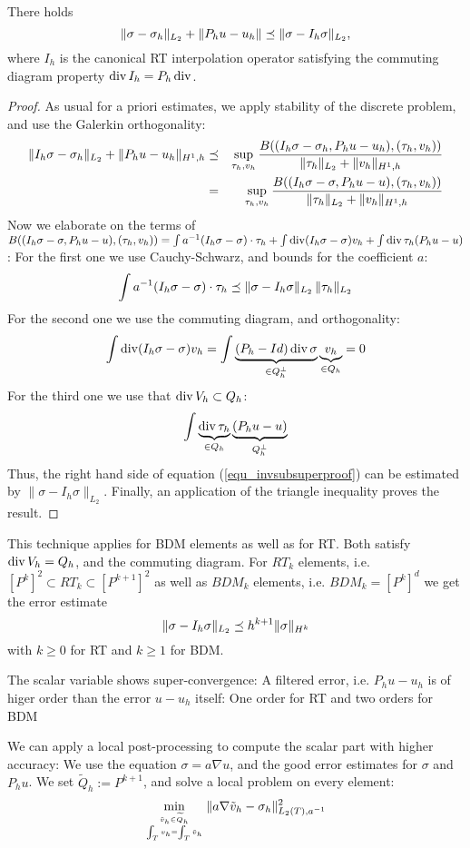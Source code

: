 \begin{theorem} There holds
$$
\| \sigma - \sigma_h \|_{L_2} + \| P_h u - u_h \|  \preceq \| \sigma - I_h \sigma \|_{L_2},
$$
where $I_h$ is the canonical RT interpolation operator satisfying the commuting diagram property $\operatorname{div} I_h = P_h \operatorname{div}$.
\end{theorem}
\begin{proof} As usual for a priori estimates, we apply stability of the discrete problem, and use the Galerkin orthogonality:
\begin{eqnarray}
\| I_h \sigma - \sigma_h \|_{L_2} + \| P_h u - u_h \|_{H^1,h} & \preceq & \sup_{\tau_h, v_h} \frac{B( (I_h \sigma - \sigma_h, P_h u - u_h), (\tau_h, v_h) )}  { \| \tau_h \|_{L_2} + \| v_h \|_{H^1,h}} \\
& = & 
\label{equ_invsubsuperproof}
\sup_{\tau_h, v_h} \frac{B( (I_h \sigma - \sigma, P_h u - u), (\tau_h, v_h) )}  { \| \tau_h \|_{L_2} + \| v_h \|_{H^1,h}} 
\end{eqnarray}
Now we elaborate on the terms of  $B( (I_h \sigma - \sigma, P_h u - u), (\tau_h, v_h) ) = \int a^{-1} (I_h \sigma - \sigma) \cdot \tau_h +
\int \operatorname{div} (I_h \sigma - \sigma) v_h + \int \operatorname{div} \tau_h (P_h u - u)$:
For the first one we use Cauchy-Schwarz, and bounds for the coefficient $a$:
$$
\int a^{-1} (I_h \sigma - \sigma) \cdot \tau_h \preceq \| \sigma - I_h \sigma \|_{L_2} \, \| \tau_h \|_{L_2}
$$
For the second one we use the commuting diagram, and orthogonality:
$$
\int \operatorname{div} (I_h \sigma - \sigma) v_h = \int \underbrace{ (P_h - Id) \operatorname{div} \sigma }_{\in Q_h^\bot} \underbrace{ v_h }_{\in Q_h} = 0
$$
For the third one we use that $\operatorname{div} V_h \subset Q_h$:
$$
\int \underbrace{ \operatorname{div} \tau_h}_{\in Q_h}   \underbrace{ (P_h  u - u) }_{Q_h^\bot}
$$
Thus, the right hand side of equation (\ref{equ_invsubsuperproof}) can be estimated by $\| \sigma - I_h \sigma \|_{L_2}$. Finally, an application of the
 triangle inequality proves the result.
\end{proof}

\begin{remark} This technique applies for BDM elements as well as for RT. Both satisfy $\operatorname{div} V_h = Q_h$, and the commuting diagram.
For $RT_k$ elements, i.e. $[P^{k}]^2 \subset RT_k \subset [P^{k+1}]^2$ as well as $BDM_k$ elements, i.e. $BDM_k = [P^k]^d$
we get the error estimate
$$
\| \sigma - I_h \sigma \|_{L_2} \preceq h^{k+1} \| \sigma \|_{H^k}
$$ 
with $k \geq 0$ for RT and $k \geq 1$ for BDM.
\end{remark}

\begin{remark} The scalar variable shows super-convergence: A filtered
  error, i.e. $P_h u - u_h$ is of higer order than the error $u - u_h$
  itself: One order for RT and two orders for BDM
\end{remark}
We can apply a local post-processing to compute the scalar part with higher accuracy: We use the equation $\sigma = a \nabla u$, and the good 
error estimates for $\sigma$ and $P_h u$. We set $\widetilde Q_h := P^{k+1}$, and solve a local 
problem on every element:
$$
\min_{\tilde v_h \in \widetilde Q_h \atop \int_T v_h = \int_T \tilde v_h}  \| a \nabla
\tilde v_h - \sigma_h \|_{L_2(T),a^{-1}}^2 
$$

